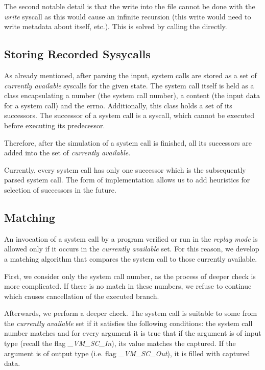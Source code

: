 The second notable detail is that the write into the file cannot be done with the \textit{write} syscall as this would cause an infinite recursion (this write would need to write metadata about itself, etc.). This is solved by calling the \vmsyscall directly.

\subsection{Storing Recorded Sysycalls} \label{sec:replay:storing}

As already mentioned, after parsing the input, system calls are stored as a set of \textit{currently available} syscalls for the given state. The system call itself is held as a class encapsulating a number (the system call number), a content (the input data for a system call) and the errno. Additionally, this class holds a set of its successors. The successor of a system call is a syscall, which cannot be executed before executing its predecessor. 

Therefore, after the simulation of a system call is finished, all its successors are added into the set of \textit{currently available}.

Currently, every system call has only one successor which is the subsequently parsed system call. The form of implementation allows us to add heuristics for selection of successors in the future.

\subsection{Matching} \label{sec:replay:matching}

An invocation of a system call by a program verified or run in the \textit{replay mode} is allowed only if it occurs in the \textit{currently available} set. For this reason, we develop a matching algorithm that compares the system call to those currently available.

First, we consider only the system call number, as the process of deeper check is more complicated. If there is no match in these numbers, we refuse to continue which causes cancellation of the executed branch.

Afterwards, we perform a deeper check. The system call is suitable to some from the \textit{currently available} set if it satisfies the following conditions: the system call number matches and for every argument it is true that if the argument is of input type (recall the flag \textit{\_VM\_SC\_In}), its value matches the captured.
If the argument is of output type (i.e. flag \textit{\_VM\_SC\_Out}), it is filled with captured data.

